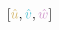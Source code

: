 \documentclass[preview]{standalone}
\begin{document}
$\left[\textcolor[HTML]{d4b76b}{\hat{u}}, \textcolor[HTML]{58c4d5}{\hat{v}}, \textcolor[HTML]{ce93ca}{\hat{w}}\right]$
\end{document}

